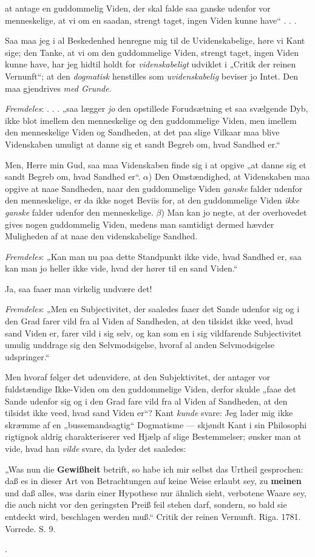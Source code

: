 \documentclass[12pt,a4paper]{book}
\begin{document}
{at antage en guddommelig Viden, der skal falde saa
ganske udenfor vor menneskelige, at vi om en saadan,
strengt taget, ingen Viden kunne have“ . . .
\par Saa maa jeg i al Beskedenhed henregne mig til de
Uvidenskabelige, høre vi Kant sige; den Tanke, at vi om
den guddommelige Viden, strengt taget, ingen Viden kunne
have, har jeg hidtil holdt for \emph{videnskabeligt} udviklet i
„Critik der reinen Vernunft“; at den \emph{dogmatisk} henstilles
som \emph{uvidenskabelig} beviser jo Intet. Den maa gjendrives
\emph{med Grunde}.
\par\noindent \emph{Fremdeles}: . . . „saa lægger \emph{jo} den opstillede Forudsætning
et saa svælgende Dyb, ikke blot imellem den menneskelige
og den guddommelige Viden, men imellem den menneskelige
Viden og Sandheden, at det paa slige Vilkaar maa
blive Videnskaben umuligt at danne sig et sandt Begreb
om, hvad Sandhed er.“
\par Men, Herre min Gud, saa maa Videnskaben finde sig
i at opgive „at danne sig et sandt Begreb om, hvad Sandhed
er“. $\alpha$) Den Omstændighed, at Videnskaben maa opgive at
naae Sandheden, naar den guddommelige Viden \emph{ganske}
falder udenfor den menneskelige, er da ikke noget Beviis for, at
den guddommelige Viden \emph{ikke ganske} falder udenfor den
menneskelige. $\beta$) Man kan jo negte, at der overhovedet
gives nogen guddommelig Viden, medens man samtidigt
dermed hævder Muligheden af at naae den videnskabelige
Sandhed.
\par\noindent \emph{Fremdeles}: „Kan man nu paa dette Standpunkt ikke
vide, hvad Sandhed er, saa kan man jo heller ikke vide,
hvad der hører til en sand Viden.“
\par Ja, saa faaer man virkelig undvære det!
\par\noindent \emph{Fremdeles}: „Men en Subjectivitet, der saaledes faaer det
Sande udenfor sig og i den Grad farer vild fra al Viden
af Sandheden, at den tilsidst ikke veed, hvad sand Viden
er, farer vild i sig selv, og kan som en i sig vildfarende
Subjectivitet umulig unddrage sig den Selvmodsigelse,
hvoraf al anden Selvmodsigelse udspringer.“
\par Men hvoraf følger det udenvidere, at den Subjektivitet,
der antager vor fuldstændige Ikke-Viden om den guddommelige
Viden, derfor skulde „faae det Sande udenfor sig og
i den Grad fare vild fra al Viden af Sandheden, at den tilsidst
ikke veed, hvad sand Viden er“? Kant \emph{kunde} svare: Jeg lader
mig ikke skræmme af en „bussemandsagtig“ Dogmatisme
--- skjøndt Kant i sin Philosophi rigtignok aldrig charakteriserer
ved Hjælp af slige Bestemmelser; ønsker man at
vide, hvad han \emph{vilde} svare, da lyder det saaledes:
\par „Was nun die \textbf{Gewißheit} betrift, so habe ich mir
selbst das Urtheil gesprochen: daß es in dieser Art von Betrachtungen
auf keine Weise erlaubt sey, zu \textbf{meinen} und
daß alles, was darin einer Hypothese nur ähnlich sieht,
verbotene Waare sey, die auch nicht vor den geringsten
Preiß feil stehen darf, sondern, so bald sie entdeckt wird,
beschlagen werden muß.“ Critik der reinen Vernunft. Riga.
1781. Vorrede. S. 9.}.
\end{document}
